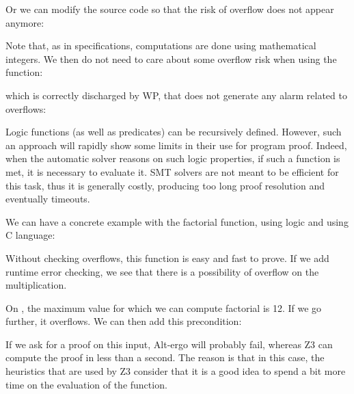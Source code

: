 

Or we can modify the source code so that the risk of overflow does not
appear anymore:




Note that, as in specifications, computations are done using mathematical
integers. We then do not need to care about some overflow risk when using
the  function:




which is correctly discharged by WP, that does not generate any alarm
related to overflows:






Logic functions (as well as predicates) can be recursively defined.
However, such an approach will rapidly show some limits in their use for
program proof. Indeed, when the automatic solver reasons on such logic
properties, if such a function is met, it is necessary to evaluate it.
SMT solvers are not meant to be efficient for this task, thus it is generally
costly, producing too long proof resolution and eventually timeouts.

We can have a concrete example with the factorial function, using logic
and using C language:






Without checking overflows, this function is easy and fast to prove. If
we add runtime error checking, we see that there is a possibility of
overflow on the multiplication.



On , the maximum value for which we can compute
factorial is 12. If we go further, it overflows. We can then add this
precondition:






If we ask for a proof on this input, Alt-ergo will probably fail,
whereas Z3 can compute the proof in less than a second. The reason is
that in this case, the heuristics that are used by Z3 consider that it
is a good idea to spend a bit more time on the evaluation of the
function.




